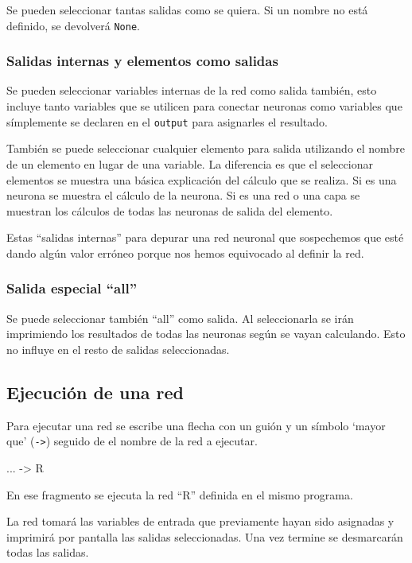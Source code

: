 \documentclass[a4paper]{article}
\begin{document}
Se pueden seleccionar tantas salidas como se quiera. Si un nombre no está definido, se devolverá \texttt{None}.

\subsubsection{Salidas internas y elementos como salidas}\label{salidas_internas}
Se pueden seleccionar variables internas de la red como salida también, esto incluye tanto variables que se utilicen para conectar neuronas como variables que símplemente se declaren en el \texttt{output} para asignarles el resultado.

También se puede seleccionar cualquier elemento para salida utilizando el nombre de un elemento en lugar de una variable. La diferencia es que el seleccionar elementos se muestra una básica explicación del cálculo que se realiza. Si es una neurona se muestra el cálculo de la neurona. Si es una red o una capa se muestran los cálculos de todas las neuronas de salida del elemento.

Estas ``salidas internas'' para depurar una red neuronal que sospechemos que esté dando algún valor erróneo porque nos hemos equivocado al definir la red.

\subsubsection{Salida especial ``all''}\label{all}
Se puede seleccionar también ``all'' como salida. Al seleccionarla se irán imprimiendo los resultados de todas las neuronas según se vayan calculando. Esto no influye en el resto de salidas seleccionadas.

\subsection{Ejecución de una red}
Para ejecutar una red se escribe una flecha con un guión y un símbolo `mayor que' (\texttt{->}) seguido de el nombre de la red a ejecutar.

\begin{codebox}
...
-> R
\end{codebox}

En ese fragmento se ejecuta la red ``R'' definida en el mismo programa.

La red tomará las variables de entrada que previamente hayan sido asignadas y imprimirá por pantalla las salidas seleccionadas. Una vez termine se desmarcarán todas las salidas.
\end{document}
